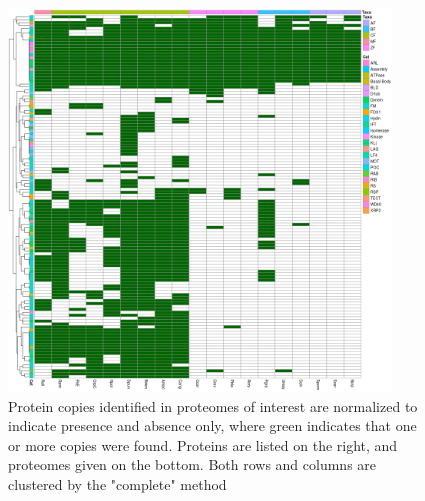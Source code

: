 
\begin{figure}
  \centering
  \includegraphics[width=4in]{./Appendix/img/flagDataHeatmap.png}
  \caption[Heatmap cluster analysis of flagellar proteins from \textit{Naegleria gruberi}]{Protein copies identified in proteomes of interest are normalized to indicate presence and absence only, where green indicates that one or more copies were found. Proteins are listed on the right, and proteomes given on the bottom. Both rows and columns are clustered by the "complete" method}
  \label{fig:AppFlag_heatmap}
\end{figure}
